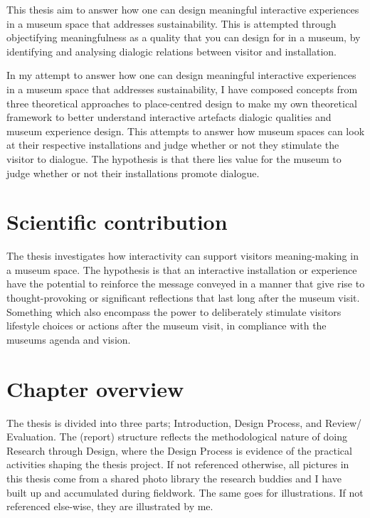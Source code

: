 This thesis aim to answer how one can design meaningful interactive experiences in a museum space that addresses sustainability. This is attempted through objectifying meaningfulness as a quality that you can design for in a museum, by identifying and analysing dialogic relations between visitor and installation.

In my attempt to answer how one can design meaningful interactive experiences in a museum space that addresses sustainability, I have composed concepts from three theoretical approaches to place-centred design to make my own theoretical framework to better understand interactive artefacts dialogic qualities and museum experience design. This attempts to answer how museum spaces can look at their respective installations and judge whether or not they stimulate the visitor to dialogue. The hypothesis is that there lies value for the museum to judge whether or not their installations promote dialogue.

\section{Scientific contribution}
The thesis investigates how interactivity can support visitors meaning-making in a museum space. The hypothesis is that an interactive installation or experience have the potential to reinforce the message conveyed in a manner that give rise to thought-provoking or significant reflections that last long after the museum visit. Something which also encompass the power to deliberately stimulate visitors lifestyle choices or actions after the museum visit, in compliance with the museums agenda and vision. 

\break
\section{Chapter overview}
The thesis is divided into three parts; Introduction, Design Process, and Review/ Evaluation. The (report) structure reflects the methodological nature of doing Research through Design, where the Design Process is evidence of the practical activities shaping the thesis project. If not referenced otherwise, all pictures in this thesis come from a shared photo library the research buddies and I have built up and accumulated during fieldwork. The same goes for illustrations. If not referenced else-wise, they are illustrated by me.

